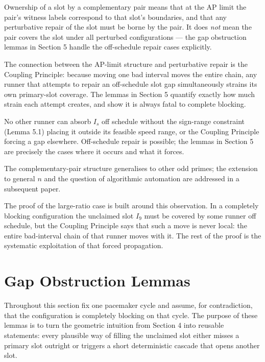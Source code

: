 \documentclass[12pt]{article}
\begin{document}
\begin{remark}\label{rem:43}
Ownership of a slot by a complementary pair means that at the AP limit the pair's
witness labels correspond to that slot's boundaries, and that any perturbative repair
of the slot must be borne by the pair. It does \emph{not} mean the pair covers the slot under
all perturbed configurations — the gap obstruction lemmas in Section 5 handle the
off-schedule repair cases explicitly.

The connection between the AP-limit structure and perturbative repair is the Coupling
Principle: because moving one bad interval moves the entire chain, any runner that
attempts to repair an off-schedule slot gap simultaneously strains its own primary-slot
coverage. The lemmas in Section 5 quantify exactly how much strain each attempt
creates, and show it is always fatal to complete blocking.

No other runner can absorb $I_s$ off schedule without the sign-range constraint
(Lemma 5.1) placing it outside its feasible speed range, or the Coupling Principle
forcing a gap elsewhere. Off-schedule repair is possible; the lemmas in Section 5 are
precisely the cases where it occurs and what it forces.

\end{remark}

\begin{remark}\label{rem:44}
The complementary-pair structure generalises to other odd primes; the
extension to general $n$ and the question of algorithmic automation are addressed in a
subsequent paper.
\end{remark}
The proof of the large-ratio case is built around this observation. In a completely blocking
configuration the unclaimed slot $I_9$ must be covered by some runner off schedule, but
the Coupling Principle says that such a move is never local: the entire bad-interval chain
of that runner moves with it. The rest of the proof is the systematic exploitation of that
forced propagation.



\section{Gap Obstruction Lemmas}

Throughout this section fix one pacemaker cycle and assume, for contradiction, that the
configuration is completely blocking on that cycle. The purpose of these lemmas is to turn
the geometric intuition from Section 4 into reusable statements: every plausible way of
filling the unclaimed slot either misses a primary slot outright or triggers a short
deterministic cascade that opens another slot.
\end{document}
